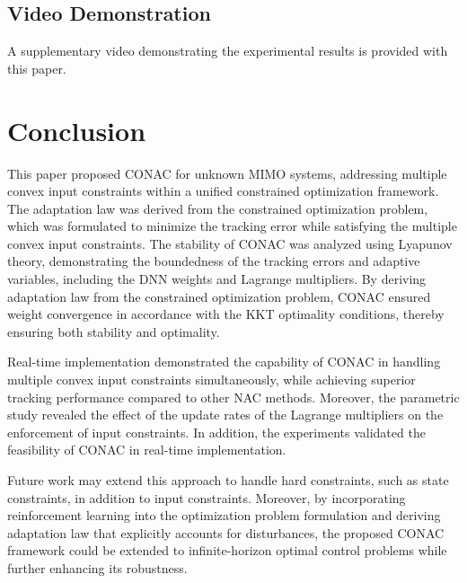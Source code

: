 \documentclass[letterpaper, journal]{IEEEtran}
\begin{document}
\subsection{Video Demonstration}

A supplementary video demonstrating the experimental results is provided with this paper.

\section{Conclusion} \label{sec:conclusion}

This paper proposed CONAC for unknown MIMO systems, addressing multiple convex input constraints within a unified constrained optimization framework. 
The adaptation law was derived from the constrained optimization problem, which was formulated to minimize the tracking error while satisfying the multiple convex input constraints.
The stability of CONAC was analyzed using Lyapunov theory, demonstrating the boundedness of the tracking errors and adaptive variables, including the DNN weights and Lagrange multipliers.
By deriving adaptation law from the constrained optimization problem, CONAC ensured weight convergence in accordance with the KKT optimality conditions, thereby ensuring both stability and optimality.

Real-time implementation demonstrated the capability of CONAC in handling multiple convex input constraints simultaneously, while achieving superior tracking performance compared to other NAC methods.
Moreover, the parametric study revealed the effect of the update rates of the Lagrange multipliers on the enforcement of input constraints.
In addition, the experiments validated the feasibility of CONAC in real-time implementation.

Future work may extend this approach to handle hard constraints, such as state constraints, in addition to input constraints. 
Moreover, by incorporating reinforcement learning into the optimization problem formulation and deriving adaptation law that explicitly accounts for disturbances, the proposed CONAC framework could be extended to infinite-horizon optimal control problems while further enhancing its robustness.

\end{document}
